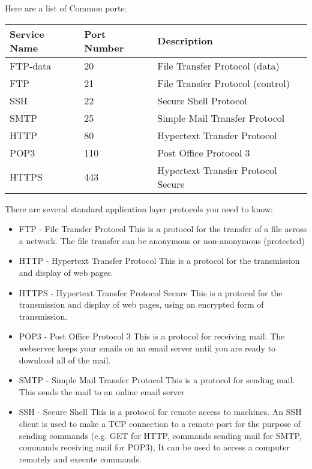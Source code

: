  Here are a list of Common ports:
  \begin{table}[H]
  	\begin{tabular}{| l | l | l |}\hline
  		Service Name & Port Number & Description \\\hline
  		FTP-data & 20 & File Transfer Protocol (data) \\\hline
  		FTP & 21 & File Transfer Protocol (control) \\\hline
  		SSH & 22 & Secure Shell Protocol \\\hline
	  	SMTP & 25 & Simple Mail Transfer Protocol \\\hline
	  	HTTP & 80 & Hypertext Transfer Protocol \\\hline
	  	POP3 & 110 & Post Office Protocol 3 \\\hline
	  	HTTPS & 443 & Hypertext Transfer Protocol Secure \\\hline
  	\end{tabular}
  \end{table}
  
  \noindent
  There are several standard application layer protocols you need to know:
  \begin{itemize}
  	\item FTP - File Transfer Protocol
	  	\subitem This is a protocol for the transfer of a file across a network. The file transfer can be anonymous or non-anonymous (protected)
  	\item HTTP - Hypertext Transfer Protocol
	  	\subitem This is a protocol for the transmission and display of web pages.
  	\item HTTPS - Hypertext Transfer Protocol Secure
	  	\subitem This is a protocol for the transmission and display of web pages, using an encrypted form of transmission.
  	\item POP3 - Post Office Protocol 3
	  	\subitem This is a protocol for receiving mail. The webserver keeps your emails on an email server until you are ready to download all of the mail.
  	\item SMTP - Simple Mail Transfer Protocol
	  	\subitem This is a protocol for sending mail. This sends the mail to an online email server
  	\item SSH - Secure Shell
	  	\subitem This is a protocol for remote access to machines. An SSH client is used to make a TCP connection to a remote port for the purpose of sending commands (e.g. GET for HTTP, commands sending mail for SMTP, commands receiving mail for POP3), It can be used to access a computer remotely and execute commands.
  \end{itemize}
  
